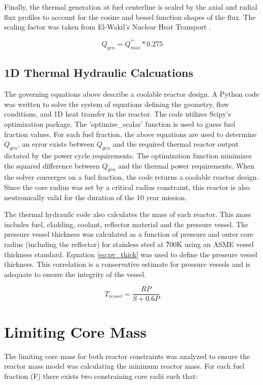 Finally, the thermal generation at fuel centerline is scaled by the axial and
radial flux profiles to account for the cosine and bessel function shapes of the
flux. The scaling factor was taken from El-Wakil's Nuclear Heat Transport
\citep{heat_trans_wakil}.

\begin{equation}
    Q_{gen} = Q^{'''}_{max} * 0.275
\end{equation}

\subsection{1D Thermal Hydraulic Calcuations}
    The governing equations above describe a coolable
reactor design. A Python code was written to solve the system of equations
defining the geometry, flow conditions, and 1D heat transfer in the reactor. The
code utilizes Scipy's optimization package. The 'optimize\_scalar' function is
used to guess fuel fraction values. For each fuel fraction, the above equations
are used to determine $Q_{gen}$, an error exists between $Q_{gen}$ and the
required thermal reactor output dictated by the power cycle requirements. The
optimization function minimizes the squared difference between $Q_{gen}$ and the
thermal power requirements. When the solver converges on a fuel fraction, the
code returns a coolable reactor design. Since the core radius was set by a
critical radius constraint, this reactor is also neutronically valid for the
duration of the 10 year mission.

    The thermal hydrauilc code also calculates the mass of each reactor. This
mass includes fuel, cladding, coolant, reflector material and the pressure
vessel. The pressure vessel thickness was calculated as a function of pressure
and outer core radius (including the reflector) for stainless steel at \~700K
using an ASME vessel thickness standard. Equation \ref{eq:pv_thick} was used to
define the pressure vessel thickness. This correlation is a conservative
estimate for pressure vessels and is adequate to ensure the integrity of the
vessel.

\begin{equation}
    T_{vessel} = \frac{RP}{S + 0.6P}
    \label{eq:pv_thick}
\end{equation}

\section{Limiting Core Mass}
The limiting core mass for both reactor constraints was analyzed to ensure the
reactor mass model was calculating the minimum reactor mass. For each fuel
fraction (F) there exists two constraining core radii such that:

